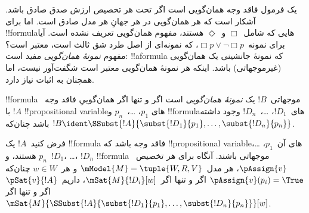 \documentclass[../../../include/open-logic-section]{subfiles}
\begin{document}


\begin{explain}
یک فرمول فاقد وجه همان‌گویی است اگر تحت هر تخصیص ارزش صدق صادق باشد.
آشکار است که هر همان‌گویی در هر جهانِ هر مدل صادق است. اما برای
!!{formula}هایی که شامل~$\Box$ و~$\Diamond$ هستند، مفهوم همان‌گویی
تعریف نشده است. آیا برای نمونه~$\Box p \lor \lnot \Box p$، که نمونه‌ای
از اصل طرد شق ثالث است، معتبر است؟ مفهوم \emph{نمونهٔ همان‌گویی} مفید
است: !!a{formula} که نمونهٔ جانشینی یک همان‌گویی (غیرموجهاتی) باشد.
اینکه هر نمونهٔ همان‌گویی معتبر است شگفت‌آور نیست، اما همچنان به اثبات
نیاز دارد.
\end{explain}

\begin{defn}
  !!{formula} موجهاتی~$!B$ یک \emph{نمونهٔ همان‌گویی} است اگر و تنها
  اگر همان‌گوییِ فاقد وجه~$!A$ با !!{propositional variable}های
  $p_1$، \dots،~$p_n$ و !!{formula}های~$!D_1$، \dots،~$!D_n$ وجود
  داشته باشد چنان‌که
  $!B \ident \SSubst{!A}{\subst{!D_1}{p_1},
    \dots, \subst{!D_n}{p_n}}$.
\end{defn}

\begin{lem}
  فرض کنید~$!A$ یک !!{formula} فاقد وجه باشد که !!{propositional
  variable}های آن~$p_1$، \dots، $p_n$ هستند، و~$!D_1$، \dots،
  $!D_n$ !!{formula} موجهاتی باشند. آنگاه برای هر تخصیص~$\pAssign{v}$،
  هر مدل~$\mModel{M} = \tuple{W, R, V}$ و هر~$w \in W$ چنان‌که
  $\pAssign{v}(p_i) = \True$ اگر و تنها اگر~$\mSat{M}{!D_i}[w]$،
  داریم~$\pSat{v}{!A}$ اگر و تنها اگر
  $\mSat{M}{\SSubst{!A}{\subst{!D_1}{p_1}, \dots,
      \subst{!D_n}{p_n}}}[w]$.
\end{lem}
\end{document}
